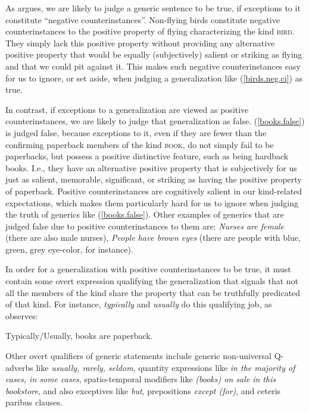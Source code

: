 \documentclass[output=paper,colorlinks,citecolor=brown]{langscibook}
\begin{document}
As \citet{leslie2008} argues, we are likely to judge
a generic sentence to be true, if exceptions to it constitute ``negative counterinstances''.
Non-flying birds constitute negative counterinstances to the positive
property of flying characterizing the kind \textsc{bird}.
They simply lack this positive property without providing any
alternative positive property that  would be equally (subjectively) salient or striking as flying and that we could pit against it.
This makes such negative counterinstances
easy for us to ignore, or set aside, when judging
a generalization like (\ref{birds.neg.ci}) as true.


In contrast, if exceptions to a generalization are viewed as
positive counterinstances, we are likely to judge that generalization
as false.
(\ref{books.false}) is judged false, because exceptions to it, even if they are fewer than the confirming paperback members of the kind \textsc{book},
do not simply fail to be paperbacks, but possess a
positive distinctive feature, such as being hardback books.
I.e., they have an alternative positive property that is subjectively for us
just as salient, memorable, significant,
or striking as having the positive property of paperback.
Positive counterinstances
are cognitively salient in our kind-related expectations, which makes them
particularly hard for us to
ignore when judging the truth of generics like (\ref{books.false}).
Other examples of generics that are judged false
due to positive counterinstances to them are: \textit{Nurses are female} (there are also male nurses),
\textit{People have brown eyes} (there are people with blue, green, grey eye-color, for instance).

In order for a generalization with positive counterinstances to be true, it must contain some overt expression qualifying the
generalization that signals that  not all the members of the
kind share the property that can be truthfully predicated of that kind. For instance, \textit{typically} and \textit{usually} do this qualifying job, as   \citet{leslie2008} observes:

\ea \label{books.paperback.true}
Typically/Usually, books are paperback. 
\z

\noindent
Other overt qualifiers of generic statements include
generic non-universal Q-adverbs like \textit{usually, rarely, seldom}, quantity expressions
like \textit{in the majority of cases, in some cases},
spatio-temporal modifiers like \textit{(books) on sale in this bookstore}, and also exceptives
like \textit{but}, prepositions \textit{except (for)}, and ceteris paribus clauses.
\end{document}
